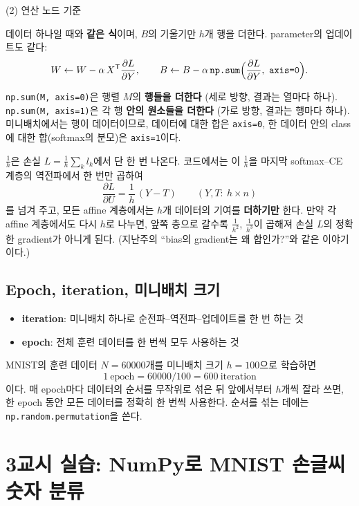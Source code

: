 \documentclass[11pt,a4paper]{article}
\newcommand{\T}{^{\mathsf T}}
\newcommand{\pd}[2]{\frac{\partial #1}{\partial #2}}
\begin{document}
\begin{keybox}
\begin{center}
\small (2) 연산 노드 기준
\end{center}
데이터 하나일 때와 \textbf{같은 식}이며, $B$의 기울기만 $h$개 행을 더한다.
parameter의 업데이트도 같다:
\[
W\leftarrow W-\alpha\,X\T\pd{L}{Y},
\qquad
B\leftarrow B-\alpha\,\texttt{np.sum}\Bigl(\pd{L}{Y},\ \texttt{axis=0}\Bigr).
\]
\end{keybox}

\begin{remarkbox}[\texttt{axis=0}과 \texttt{axis=1}]
\texttt{np.sum(M, axis=0)}은 행렬 $M$의 \textbf{행들을 더한다} (세로 방향, 결과는 열마다 하나).
\texttt{np.sum(M, axis=1)}은 각 행 \textbf{안의 원소들을 더한다} (가로 방향, 결과는 행마다 하나).
미니배치에서는 행이 데이터이므로, 데이터에 대한 합은 \texttt{axis=0},
한 데이터 안의 class에 대한 합(softmax의 분모)은 \texttt{axis=1}이다.
\end{remarkbox}

\begin{thinkbox}[평균은 한 번만 낸다]
$\frac1h$은 손실 $L=\frac1h\sum_k l_k$에서 단 한 번 나온다.
코드에서는 이 $\frac1h$을 마지막 softmax--CE 계층의 역전파에서 한 번만 곱하여
\[
\pd{L}{U}=\frac1h\,(Y-T)\qquad(Y,T:\ h\times n)
\]
를 넘겨 주고, 모든 affine 계층에서는 $h$개 데이터의 기여를 \textbf{더하기만} 한다.
만약 각 affine 계층에서도 다시 $h$로 나누면,
앞쪽 층으로 갈수록 $\frac1{h^2}$, $\frac1{h^3}$이 곱해져
손실 $L$의 정확한 gradient가 아니게 된다.
(지난주의 ``bias의 gradient는 왜 합인가?''와 같은 이야기이다.)
\end{thinkbox}

\subsection{Epoch, iteration, 미니배치 크기}

\begin{itemize}[leftmargin=1.8em]
\item \textbf{iteration}: 미니배치 하나로 순전파--역전파--업데이트를 한 번 하는 것
\item \textbf{epoch}: 전체 훈련 데이터를 한 번씩 모두 사용하는 것
\end{itemize}
MNIST의 훈련 데이터 $N=60000$개를 미니배치 크기 $h=100$으로 학습하면
\[
1\ \text{epoch}=60000/100=600\ \text{iteration}
\]
이다.
매 epoch마다 데이터의 순서를 무작위로 섞은 뒤
앞에서부터 $h$개씩 잘라 쓰면, 한 epoch 동안 모든 데이터를 정확히 한 번씩 사용한다.
순서를 섞는 데에는 \texttt{np.random.permutation}을 쓴다.

\section{3교시 실습: NumPy로 MNIST 손글씨 숫자 분류}
\end{document}
